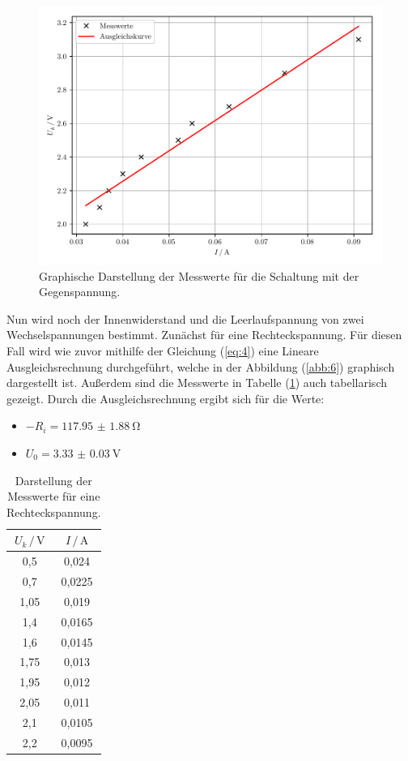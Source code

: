 \begin{figure}[H]
  \centering
  \includegraphics{plot2.pdf}
  \caption{Graphische Darstellung der Messwerte für die Schaltung mit der Gegenspannung.}
  \label{abb:5}
\end{figure}

Nun wird noch der Innenwiderstand und die Leerlaufspannung von zwei Wechselspannungen bestimmt.
Zunächst für eine Rechteckspannung. Für diesen Fall wird wie zuvor mithilfe der Gleichung
(\ref{eq:4}) eine Lineare Ausgleichsrechnung durchgeführt, welche in der Abbildung
(\ref{abb:6}) graphisch dargestellt ist. Außerdem sind die Messwerte in Tabelle (\ref{tab:3})
auch tabellarisch gezeigt.
Durch die Ausgleichsrechnung ergibt sich für die Werte:

\begin{itemize}
  \item $-R_i = \SI{117.95(188)}{\ohm}$
  \item $U_0 = \SI{3.33(3)}{\volt}$
\end{itemize}

\begin{table}[H]
  \centering
  \caption{Darstellung der Messwerte für eine Rechteckspannung.}
  \label{tab:3}
  \begin{tabular}{c c}
    \toprule
    $U_k \, / \, \si{\volt}$ & $ I \, / \, \si{\ampere}$ \\
    \midrule
    0,5  & 0,024  \\
    0,7  & 0,0225 \\
    1,05 & 0,019  \\
    1,4  & 0,0165 \\
    1,6  & 0,0145 \\
    1,75 & 0,013  \\
    1,95 & 0,012  \\
    2,05 & 0,011  \\
    2,1  & 0,0105 \\
    2,2  & 0,0095 \\
    \bottomrule
  \end{tabular}
\end{table}

